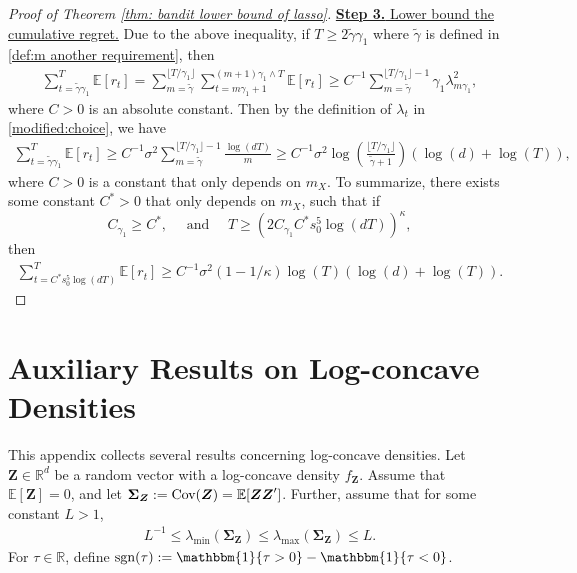 \documentclass[aos,preprint]{imsart}
\theoremstyle{plain}
\theoremstyle{definition}
\newcommand{\idf}{\mathbbm{1}}
\newcommand{\bSigma}{\boldsymbol{\Sigma}}
\newcommand{\lmin}[1]{\lambda_{\min}\left(#1\right)}
\newcommand{\lmax}[1]{\lambda_{\max}\left(#1\right)}
\newcommand{\mS}{\mathcal{S}}
\newcommand{\bv}{\boldsymbol{v}}
\newcommand{\bZ}{\boldsymbol{Z}}
\newcommand{\bR}{\mathbb{R}}
\newcommand{\Exp}{\mathbb{E}}
\begin{document}
\begin{appendix}
\begin{proof}[Proof of Theorem \ref{thm: bandit lower bound of lasso}]
\medskip
\noindent \underline{\textbf{Step 3.} Lower bound the cumulative regret.} Due to the above inequality, if $T \geq 2\tilde{\gamma} \gamma_1$ where $\tilde{\gamma}$ is defined in \eqref{def:m another requirement}, then
\begin{align*}
   \sum_{t = \tilde{\gamma} \gamma_1}^{T} \Exp\left[r_t \right]   = \sum_{m = \tilde{\gamma}}^{\lfloor T/\gamma_1 \rfloor} \sum_{t = m\gamma_1+1}^{(m+1) \gamma_1 \wedge T} \Exp\left[r_t \right]  \geq   C^{-1}   \sum_{m = \tilde{\gamma}}^{\lfloor T/\gamma_1 \rfloor - 1} 
   \gamma_1 \lambda_{m\gamma_1}^2,
\end{align*}
where $C > 0$ is an absolute constant. Then by the definition of $\lambda_{t}$ in \eqref{modified:choice}, we have
\begin{align*}
   \sum_{t = \tilde{\gamma} \gamma_1}^{T} \Exp\left[r_t \right]  \geq   C^{-1}  \sigma^2 \sum_{m = \tilde{\gamma}}^{\lfloor T/\gamma_1 \rfloor - 1} 
    \frac{\log(dT)}{m} \geq C^{-1} \sigma^2  \log\left(\frac{\lfloor T/\gamma_1 \rfloor}{\tilde{\gamma} + 1}\right)(\log(d) + \log(T)),
\end{align*}
where $C > 0$ is a constant that only depends on $m_X$. To summarize, there exists some constant $C^* > 0$ that only depends on $m_X$, such that if 
$$
C_{\gamma_1} \geq C^*, \quad \text{ and } \quad
T  \geq (2C_{\gamma_1} C^*  s_0^5\log(dT) )^\kappa,
$$
then 
\begin{align*}
   \sum_{t = C^* s_0^5 \log(dT)}^{T} \Exp\left[r_t \right]  \geq    C^{-1}  \sigma^2 (1-1/\kappa) \log\left(T\right)(\log(d) + \log(T)).
\end{align*}
\end{proof}











\section{Auxiliary Results on Log-concave Densities} \label{sec: log-concave}
This appendix collects several results concerning log-concave densities. Let $\bZ \in \bR^{d}$ be a random vector with a log-concave density $f_{\bZ}$. Assume that $\Exp[\bZ] = 0$, and let $\bSigma_{\bZ} := \textup{Cov}(\bZ) = \Exp[\bZ\bZ']$. 
Further, assume that for some constant $L > 1$,
\begin{align}\label{app:log_assumption}
    L^{-1}\le \lmin{\bSigma_{\bZ} }\le \lmax{\bSigma_{\bZ} }\le L.
\end{align}
For $\tau \in \bR$, define $\text{sgn}(\tau) := \idf\{\tau > 0\} - \idf\{\tau < 0\}$.


\end{appendix}
\end{document}
